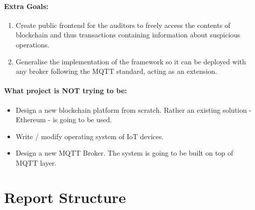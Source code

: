 \paragraph{Extra Goals:}
\begin{enumerate}
  \item Create public frontend for the auditors to freely access the contents of blockchain and thus transactions containing information about suspicious operations.
  \item Generalise the implementation of the framework so it can be deployed with any broker following the MQTT standard, acting as an extension.
\end{enumerate}

\paragraph{What project is NOT trying to be:}
\begin{itemize}
  \item Design a new blockchain platform from scratch. Rather an existing solution - Ethereum - is going to be used.
  \item Write / modify operating system of IoT devices.
  \item Design a new MQTT Broker. The system is going to be built on top of MQTT layer.
\end{itemize}

\section{Report Structure}

